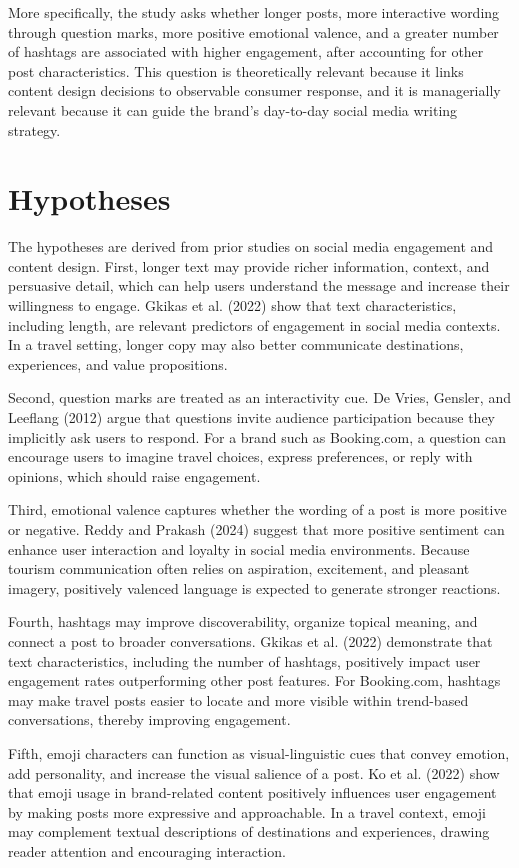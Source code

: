 \documentclass[12pt,a4paper,fontset=none]{ctexart}
\begin{document}
More specifically, the study asks whether longer posts, more interactive wording through question marks, more positive emotional valence, and a greater number of hashtags are associated with higher engagement, after accounting for other post characteristics. This question is theoretically relevant because it links content design decisions to observable consumer response, and it is managerially relevant because it can guide the brand's day-to-day social media writing strategy.

\section{Hypotheses}
The hypotheses are derived from prior studies on social media engagement and content design. First, longer text may provide richer information, context, and persuasive detail, which can help users understand the message and increase their willingness to engage. Gkikas et al. (2022) show that text characteristics, including length, are relevant predictors of engagement in social media contexts. In a travel setting, longer copy may also better communicate destinations, experiences, and value propositions.

Second, question marks are treated as an interactivity cue. De Vries, Gensler, and Leeflang (2012) argue that questions invite audience participation because they implicitly ask users to respond. For a brand such as Booking.com, a question can encourage users to imagine travel choices, express preferences, or reply with opinions, which should raise engagement.

Third, emotional valence captures whether the wording of a post is more positive or negative. Reddy and Prakash (2024) suggest that more positive sentiment can enhance user interaction and loyalty in social media environments. Because tourism communication often relies on aspiration, excitement, and pleasant imagery, positively valenced language is expected to generate stronger reactions.

Fourth, hashtags may improve discoverability, organize topical meaning, and connect a post to broader conversations. Gkikas et al. (2022) demonstrate that text characteristics, including the number of hashtags, positively impact user engagement rates outperforming other post features. For Booking.com, hashtags may make travel posts easier to locate and more visible within trend-based conversations, thereby improving engagement.

Fifth, emoji characters can function as visual-linguistic cues that convey emotion, add personality, and increase the visual salience of a post. Ko et al. (2022) show that emoji usage in brand-related content positively influences user engagement by making posts more expressive and approachable. In a travel context, emoji may complement textual descriptions of destinations and experiences, drawing reader attention and encouraging interaction.
\end{document}
